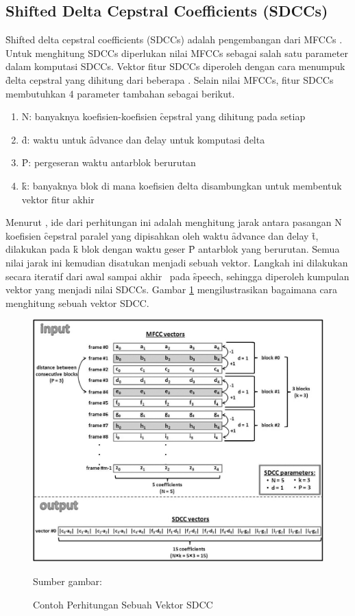 	\subsection{Shifted Delta Cepstral Coefficients (SDCCs)}  \label{teorisdcc}
  \f{Shifted delta cepstral coefficients (SDCCs)} adalah pengembangan dari MFCCs \citep{torres2002approaches}. Untuk menghitung SDCCs diperlukan nilai MFCCs sebagai salah satu parameter dalam komputasi SDCCs. Vektor fitur SDCCs diperoleh dengan cara menumpuk \f{delta cepstral} yang dihitung dari beberapa \fr. Selain nilai MFCCs, fitur SDCCs membutuhkan 4 parameter tambahan sebagai berikut.
  \begin{enumerate}
    \item N: banyaknya koefisien-koefisien \f{cepstral} yang dihitung pada setiap \fr
    \item \f{d}: waktu untuk \f{advance} dan \f{delay} untuk komputasi \f{delta}
    \item \f{P}: pergeseran waktu antarblok berurutan
    \item \f{k}: banyaknya blok di mana koefisien \f{delta} disambungkan untuk membentuk vektor fitur akhir
  \end{enumerate}
  
  Menurut \cite{zahra2013unique}, ide dari perhitungan ini adalah menghitung jarak antara pasangan N koefisien \f{cepstral} paralel yang dipisahkan oleh waktu \f{advance} dan \f{delay} \f{t}, dilakukan pada \f{k} blok dengan waktu geser \f{P} antarblok yang berurutan. Semua nilai jarak ini kemudian disatukan menjadi sebuah vektor. Langkah ini dilakukan secara iteratif dari awal sampai akhir \fr~pada \f{speech}, sehingga diperoleh kumpulan vektor yang menjadi nilai SDCCs. Gambar \ref{fig:hitungsdcc} mengilustrasikan bagaimana cara menghitung sebuah vektor SDCC.
  \begin{figure}
    \centering
    \includegraphics[width=\linewidth]{pics/hitung_sdcc_mono}
    \caption{Contoh Perhitungan Sebuah Vektor SDCC}{Sumber gambar: \cite{zahra2013unique}}
    \label{fig:hitungsdcc}
  \end{figure}



